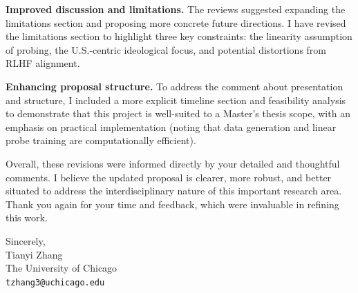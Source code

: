 \documentclass[11pt]{article}
\begin{document}
\textbf{Improved discussion and limitations.} The reviews suggested expanding the limitations section and proposing more concrete future directions. I have revised the limitations section to highlight three key constraints: the linearity assumption of probing, the U.S.-centric ideological focus, and potential distortions from RLHF alignment.

\textbf{Enhancing proposal structure.} To address the comment about presentation and structure, I included a more explicit timeline section and feasibility analysis to demonstrate that this project is well-suited to a Master’s thesis scope, with an emphasis on practical implementation (noting that data generation and linear probe training are computationally efficient).

Overall, these revisions were informed directly by your detailed and thoughtful comments. I believe the updated proposal is clearer, more robust, and better situated to address the interdisciplinary nature of this important research area. Thank you again for your time and feedback, which were invaluable in refining this work.

\bigskip

Sincerely, \\
Tianyi Zhang \\
The University of Chicago \\
\texttt{tzhang3@uchicago.edu}
\end{document}
